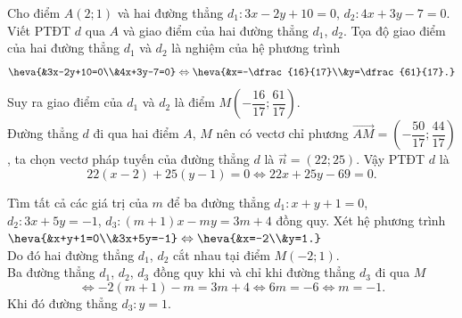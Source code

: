 	\begin{bt}%
		Cho điểm $A(2;1)$ và hai đường thẳng $d_1\colon 3x-2y+10=0$, $d_2\colon 4x+3y-7=0$. Viết PTĐT $d$ qua $A$ và giao điểm của hai đường thẳng $d_1$, $d_2$.
		\loigiai
		{Tọa độ giao điểm của hai đường thẳng $d_1$ và $d_2$ là nghiệm của hệ phương trình 
			$$\heva{&3x-2y+10=0\\&4x+3y-7=0} \Leftrightarrow \heva{&x=-\dfrac{16}{17}\\&y=\dfrac{61}{17}.}$$
			Suy ra giao điểm của $d_1$ và $d_2$ là điểm $M\left(-\dfrac{16}{17};\dfrac{61}{17}\right)$.\\
			Đường thẳng $d$ đi qua hai điểm $A$, $M$ nên có vectơ chỉ phương $\overrightarrow{AM}=\left(-\dfrac{50}{17};\dfrac{44}{17}\right)$, ta chọn vectơ pháp tuyến của đường thẳng $d$ là $\overrightarrow{n}=\left(22;25\right)$. Vậy PTĐT $d$ là
			$$22(x-2)+25(y-1)=0 \Leftrightarrow 22x+25y-69=0.$$}
	\end{bt}
	
	\begin{bt}%
		Tìm tất cả các giá trị của $m$ để ba đường thẳng $d_1\colon x+y+1=0$, $d_2\colon 3x+5y=-1$, $d_3\colon (m+1)x-my=3m+4$ đồng quy.
		\loigiai
		{Xét hệ phương trình $\heva{&x+y+1=0\\&3x+5y=-1}\Leftrightarrow \heva{&x=-2\\&y=1.}$\\
			Do đó hai đường thẳng $d_1$, $d_2$ cắt nhau tại điểm $M(-2;1)$.\\
			Ba đường thẳng $d_1$, $d_2$, $d_3$ đồng quy khi và chỉ khi đường thẳng $d_3$ đi qua $M$ 
			$$\Leftrightarrow -2\left(m+1\right)-m=3m+4 \Leftrightarrow 6m=-6 \Leftrightarrow m=-1.$$
			Khi đó đường thẳng $d_3\colon y=1$.}
	\end{bt}
	
